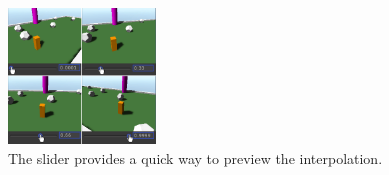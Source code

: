 


\begin{figure}[htbp]
\centering
\includegraphics[width=0.35\textwidth]{Pics/slider}
\caption{The slider provides a quick way to preview the interpolation.}
\label{fig:slider}
\end{figure}

